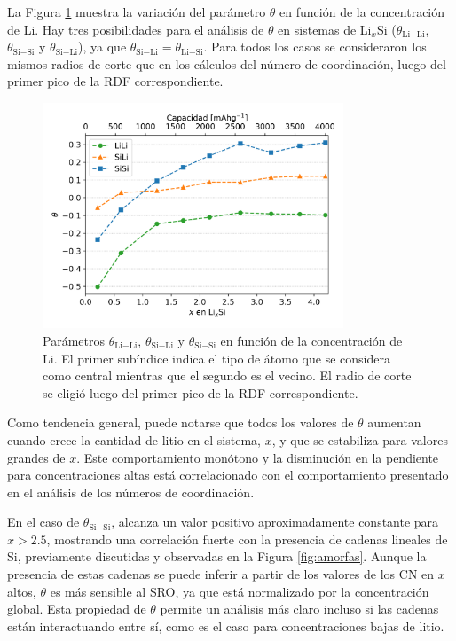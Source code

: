 La Figura \ref{fig:sro} muestra la variación del parámetro $\theta$ en función 
de la concentración de Li. Hay tres posibilidades para el análisis de $\theta$ en
sistemas de Li$_x$Si ($\theta_{\text{Li}-\text{Li}}$, $\theta_{\text{Si}-\text{Si}}$ y $\theta_{\text{Si}-\text{Li}}$), ya
que $\theta_{\text{Si}-\text{Li}} = \theta_{\text{Li}-\text{Si}}$. Para todos los casos se consideraron los
mismos radios de corte que en los cálculos del número de coordinación, luego del
primer pico de la RDF correspondiente.
\begin{figure}[th]
    \centering
    \includegraphics[width=0.8\textwidth]{Silicio/caracterizacion/resultados/sro/sro.png}
    \caption{Parámetros $\theta_{\text{Li}-\text{Li}}$, $\theta_{\text{Si}-\text{Li}}$ y $\theta_{\text{Si}-\text{Si}}$ 
    en función de la concentración de Li. El primer subíndice indica el tipo de
    átomo que se considera como central mientras que el segundo es el vecino. El
    radio de corte se eligió luego del primer pico de la RDF correspondiente.}
    \label{fig:sro}
\end{figure}

Como tendencia general, puede notarse que todos los valores de $\theta$ aumentan
cuando crece la cantidad de litio en el sistema, $x$, y que se estabiliza para 
valores grandes de $x$. Este comportamiento monótono y la disminución en la 
pendiente para concentraciones altas está correlacionado con el comportamiento
presentado en el análisis de los números de coordinación.

En el caso de $\theta_{\text{Si}-\text{Si}}$, alcanza un valor positivo aproximadamente 
constante para $x > 2.5$, mostrando una correlación fuerte con la presencia de 
cadenas lineales de Si, previamente discutidas y observadas en la Figura 
\ref{fig:amorfas}. Aunque la presencia de estas cadenas se puede inferir a partir
de los valores de los CN en $x$ altos, $\theta$ es más sensible al SRO, ya que
está normalizado por la concentración global. Esta propiedad de $\theta$ permite
un análisis más claro incluso si las cadenas están interactuando entre sí, como
es el caso para concentraciones bajas de litio.

